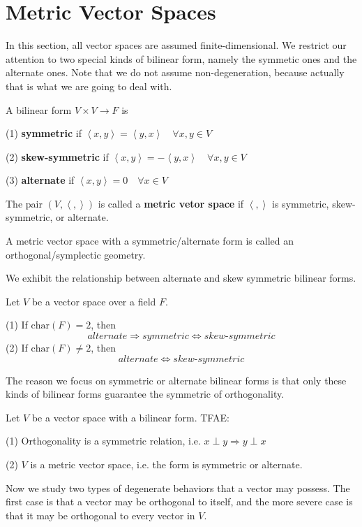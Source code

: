 \section{Metric Vector Spaces}
In this section, all vector spaces are assumed finite-dimensional. We restrict our attention to two special kinds of bilinear form, namely the symmetic ones and the alternate ones. Note that we do not assume non-degeneration, because actually that is what we are going to deal with.
\begin{definition}
A bilinear form $V\times V\to F$ is \par
(1) \textbf{symmetric} if $\left\langle x,y\right\rangle = \left\langle y,x \right\rangle\quad\forall x,y\in V$\par
(2) \textbf{skew-symmetric} if $\left\langle x,y\right\rangle =- \left\langle y,x \right\rangle\quad\forall x,y\in V$\par
(3) \textbf{alternate} if $\left\langle x,y\right\rangle = 0\quad\forall x\in V$
\end{definition}
\begin{definition}
The pair $(V,\left\langle ,\right\rangle)$ is called a \textbf{metric vetor space} if $\left\langle ,\right\rangle$ is symmetric, skew-symmetric, or alternate.
\end{definition}
\begin{remark}
A metric vector space with a symmetric/alternate form is called an orthogonal/symplectic geometry. 
\end{remark}
We exhibit the relationship between alternate and skew symmetric bilinear forms.
\begin{theorem}
Let $V$ be a vector space over a field $F$.\par
(1) If $\text{char}(F)=2$, then \[alternate\Longrightarrow symmetric \Longleftrightarrow skew\text{-}symmetric\]
(2) If $\text{char}(F)\ne2$, then \[alternate\Longleftrightarrow skew\text{-}symmetric\]
\end{theorem}
The reason we focus on symmetric or alternate bilinear forms is that only these kinds of bilinear forms guarantee the symmetric of orthogonality.
\begin{theorem}
Let $V$ be a vector space with a bilinear form. TFAE:\par
(1) Orthogonality is a symmetric relation, i.e. $x\perp y\Longrightarrow y\perp x$\par
(2) $V$ is a metric vector space, i.e. the form is symmetric or alternate.
\end{theorem}
Now we study two types of degenerate behaviors that a vector may possess. The first case is that a vector may be orthogonal to itself, and the more severe case is that it may be orthogonal to every vector in $V$.
